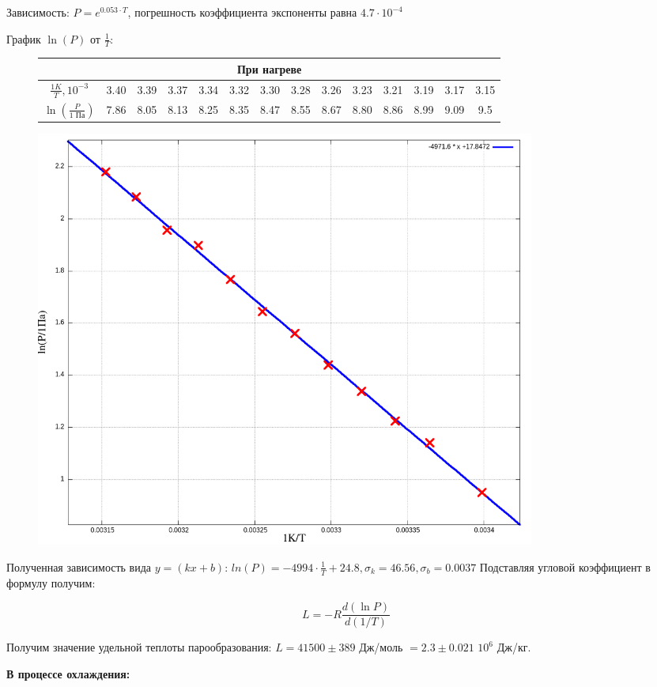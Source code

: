 \documentclass[a4paper,10pt]{article} %
\begin{document}
Зависимость: $P = e^{0.053\cdot T}$, погрешность коэффициента экспоненты равна $4.7\cdot 10^{-4}$ 




График $\ln(P)$ от $\frac{1}{T}$:

\begin{figure}[H]
	\centering
	\begin{tabular}{|c|c|c|c|c|c|c|c|c|c|c|c|c|c|}
		\hline
		\multicolumn{14}{|c|}{При нагреве}\\
		\hline
		$\frac{1 K}{T}, 10^{-3}$&3.40&3.39&3.37&3.34&3.32&3.30&3.28&3.26&3.23&3.21&3.19&3.17&3.15\\\hline
		$\ln(\frac{P}{\text{1 Па}})$&7.86&8.05&8.13&8.25&8.35&8.47&8.55&8.67&8.80&8.86&8.99&9.09&9.5\\\hline
	\end{tabular}
\end{figure}



\begin{figure}[H]
	\centering
	\includegraphics[width=0.8\textwidth]{2-4-1-2-res.png}
\end{figure}

Полученная зависимость вида $y = (kx + b)$:
\(ln(P) = -4994\cdot \frac{1}{T} + 24.8, \sigma_k = 46.56,  \sigma_b = 0.0037\)
Подставляя угловой коэффициент в формулу получим:

$$ L = -R\frac{d(\ln P)}{d(1/T)} $$

Получим значение удельной теплоты парообразования: $L = 41500 \pm 389$ Дж/моль $= 2.3 \pm 0.021$ $10^{6}$ Дж/кг.

\medskip

\textbf{В процессе охлаждения:}
\end{document}
